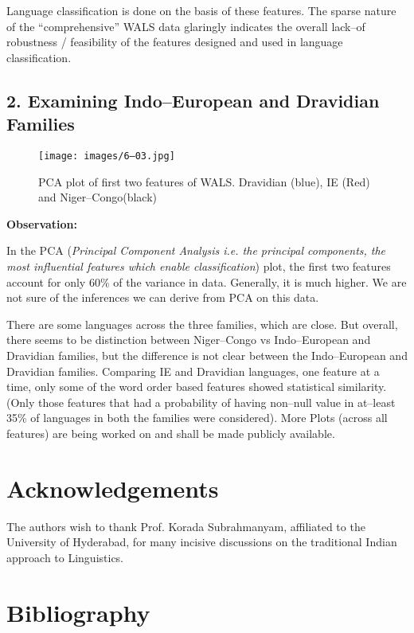 Language classification is done on the basis of these features. The sparse nature of the “comprehensive” WALS data glaringly indicates the overall lack–of robustness / feasibility of the features designed and used in language classification.


\subsection*{2. Examining Indo–European and Dravidian Families}

\begin{figure}[!htbp]
\texttt{[image: images/6–03.jpg]}
\caption{PCA plot of first two features of WALS. Dravidian (blue), IE (Red) and Niger–Congo(black)}\label{art6-fig03}
\end{figure}

\textbf{Observation:}

In the PCA (\textit{Principal Component Analysis i.e. the principal components, the most influential features which enable classification}) plot, the first two features account for only 60\% of the variance in data. Generally, it is much higher. We are not sure of the inferences we can derive from PCA on this data.

There are some languages across the three families, which are close. But overall, there seems to be distinction between Niger–Congo vs Indo–European and Dravidian families, but the difference is not clear between the Indo–European and Dravidian families. Comparing IE and Dravidian languages, one feature at a time, only some of the word order based features showed statistical similarity. (Only those features that had a probability of having non–null value in at–least 35\% of languages in both the families were considered). More Plots (across all features) are being worked on and shall be made publicly available.


\section*{Acknowledgements}

The authors wish to thank Prof. Korada Subrahmanyam, affiliated to the University of Hyderabad, for many incisive discussions on the traditional Indian approach to Linguistics.


\section*{Bibliography}


